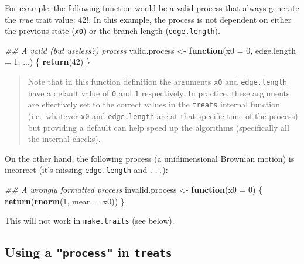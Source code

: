 \documentclass[
]{book}
\newenvironment{Shaded}{\begin{snugshade}}{\end{snugshade}}
\newcommand{\CommentTok}[1]{\textcolor[rgb]{0.56,0.35,0.01}{\textit{#1}}}
\newcommand{\ControlFlowTok}[1]{\textcolor[rgb]{0.13,0.29,0.53}{\textbf{#1}}}
\newcommand{\DataTypeTok}[1]{\textcolor[rgb]{0.13,0.29,0.53}{#1}}
\newcommand{\DecValTok}[1]{\textcolor[rgb]{0.00,0.00,0.81}{#1}}
\newcommand{\KeywordTok}[1]{\textcolor[rgb]{0.13,0.29,0.53}{\textbf{#1}}}
\newcommand{\NormalTok}[1]{#1}
\newcommand{\StringTok}[1]{\textcolor[rgb]{0.31,0.60,0.02}{#1}}
\begin{document}
For example, the following function would be a valid process that always generate the \emph{true} trait value: 42!.
In this example, the process is not dependent on either the previous state (\texttt{x0}) or the branch length (\texttt{edge.length}).

\begin{Shaded}
\begin{Highlighting}[]
\CommentTok{\#\# A valid (but useless?) process}
\NormalTok{valid.process \textless{}{-}}\StringTok{ }\ControlFlowTok{function}\NormalTok{(}\DataTypeTok{x0 =} \DecValTok{0}\NormalTok{, }\DataTypeTok{edge.length =} \DecValTok{1}\NormalTok{, ...) \{}
    \KeywordTok{return}\NormalTok{(}\DecValTok{42}\NormalTok{)}
\NormalTok{\}}
\end{Highlighting}
\end{Shaded}

\begin{quote}
Note that in this function definition the arguments \texttt{x0} and \texttt{edge.length} have a default value of \texttt{0} and \texttt{1} respectively. In practice, these arguments are effectively set to the correct values in the \texttt{treats} internal function (i.e.~whatever \texttt{x0} and \texttt{edge.length} are at that specific time of the process) but providing a default can help speed up the algorithms (specifically all the internal checks).
\end{quote}

On the other hand, the following process (a unidimensional Brownian motion) is incorrect (it's missing \texttt{edge.length} and \texttt{...}):

\begin{Shaded}
\begin{Highlighting}[]
\CommentTok{\#\# A wrongly formatted process}
\NormalTok{invalid.process \textless{}{-}}\StringTok{ }\ControlFlowTok{function}\NormalTok{(}\DataTypeTok{x0 =} \DecValTok{0}\NormalTok{) \{}
    \KeywordTok{return}\NormalTok{(}\KeywordTok{rnorm}\NormalTok{(}\DecValTok{1}\NormalTok{, }\DataTypeTok{mean =}\NormalTok{ x0))}
\NormalTok{\}}
\end{Highlighting}
\end{Shaded}

This will not work in \texttt{make.traits} (see below).

\hypertarget{using-a-process-in-treats}{%
\subsection{\texorpdfstring{Using a \texttt{"process"} in \texttt{treats}}{Using a "process" in treats}}\label{using-a-process-in-treats}}
\end{document}
